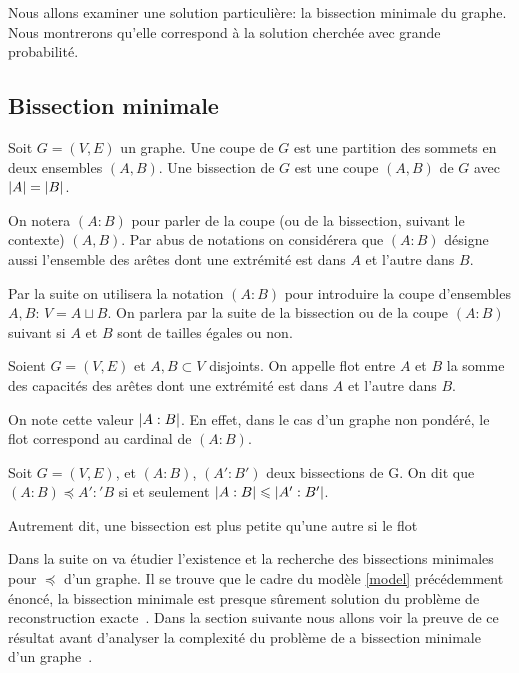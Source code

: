 \documentclass{standalone}
\begin{document}
	Nous allons examiner une solution particulière: la bissection minimale du graphe. Nous montrerons qu'elle correspond à la solution cherchée avec grande probabilité.

\subsection{Bissection minimale}

	\begin{defn}
		Soit $G=(V, E)$ un graphe. Une coupe de $G$ est une partition des sommets en deux ensembles $(A, B)$. Une bissection de $G$ est une coupe $(A,B)$ de $G$ avec $\left| A\right| = \left| B\right|$.
		
		On notera $(A:B)$ pour parler de la coupe (ou de la bissection, suivant le contexte) $(A,B)$. Par abus de notations on considérera que $(A:B)$ désigne aussi l'ensemble des arêtes dont une extrémité est dans $A$ et l'autre dans $B$.
	\end{defn}

	\begin{rem}
		Par la suite on utilisera la notation $(A:B)$ pour introduire la coupe d'ensembles $A, B$: $V = A \sqcup B$.
		On parlera par la suite de la bissection ou de la coupe $(A:B)$ suivant si $A$ et $B$ sont de tailles égales ou non.
	\end{rem}

	\begin{defn}[Flot]
		Soient $G = (V, E)$ et $A, B \subset V$ disjoints. On appelle flot entre $A$ et $B$ la somme des capacités des arêtes dont une extrémité est dans $A$ et l'autre dans $B$. 
		
		On note cette valeur $\left| A:B\right|$. En effet, dans le cas d'un graphe non pondéré, le flot correspond au cardinal de $(A:B)$.
	\end{defn}

	\begin{defn}
		Soit $G=(V, E)$, et $(A:B)$, $(A':B')$ deux bissections de G.
		On dit que $(A:B) \preceq A':'B$ si et seulement $\left| A:B\right| \leqslant \left| A':B'\right|$.
		
		Autrement dit, une bissection est plus petite qu'une autre si le flot
	\end{defn}

	Dans la suite on va étudier l'existence et la recherche des bissections minimales pour $\preceq$ d'un graphe. Il se trouve que le cadre du modèle \ref{model} précédemment énoncé, la bissection minimale est presque sûrement solution du problème de reconstruction exacte~\cite{dyier}. Dans la section suivante nous allons voir la preuve de ce résultat avant d'analyser la complexité du problème de a bissection minimale d'un graphe~\cite{simplenphard}.
\end{document}
